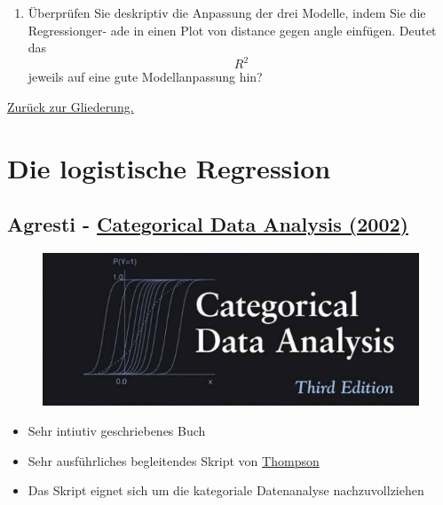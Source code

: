 \documentclass[]{article}
\providecommand{\tightlist}{%
  \setlength{\itemsep}{0pt}\setlength{\parskip}{0pt}}
\begin{document}
\begin{enumerate}
\def\labelenumi{(\alph{enumi})}
\setcounter{enumi}{3}
\tightlist
\item
  Überprüfen Sie deskriptiv die Anpassung der drei Modelle, indem Sie
  die Regressionger- ade in einen Plot von distance gegen angle
  einfügen. Deutet das \[ R^2 \] jeweils auf eine gute Modellanpassung
  hin?
\end{enumerate}

\href{https://github.com/Japhilko/IntroR/blob/master/2017/README.md}{Zurück
zur Gliederung.}

\section{Die logistische Regression}\label{die-logistische-regression}

\subsection{\texorpdfstring{Agresti -
\href{https://mathdept.iut.ac.ir/sites/mathdept.iut.ac.ir/files/AGRESTI.PDF}{Categorical
Data Analysis
(2002)}}{Agresti - Categorical Data Analysis (2002)}}\label{agresti---categorical-data-analysis-2002}

\begin{figure}[htbp]
\centering
\includegraphics{figure/CDAagresti.PNG}
\caption{}
\end{figure}

\begin{itemize}
\tightlist
\item
  Sehr intiutiv geschriebenes Buch
\item
  Sehr ausführliches begleitendes Skript von
  \href{http://statweb.stanford.edu/~owen/courses/306a/Splusdiscrete2.pdf}{Thompson}
\item
  Das Skript eignet sich um die kategoriale Datenanalyse
  nachzuvollziehen
\end{itemize}
\end{document}
